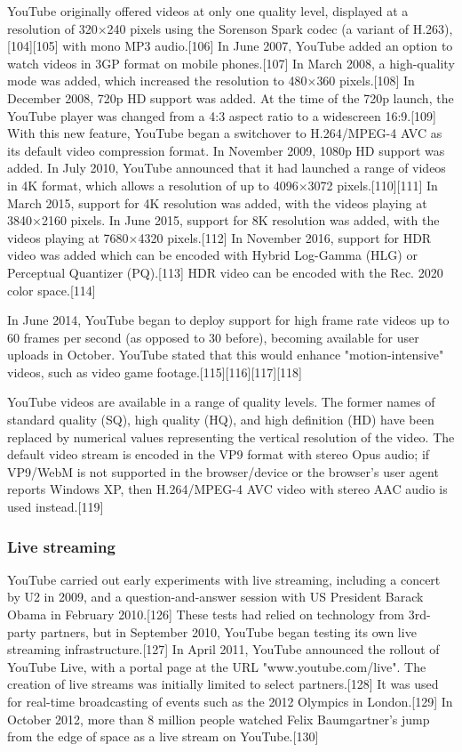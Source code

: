 \documentclass[12pt]{article}
\begin{document}
YouTube originally offered videos at only one quality level, displayed at a resolution of 320$\times$240 pixels using the Sorenson Spark codec (a variant of H.263),[104][105] with mono MP3 audio.[106] In June 2007, YouTube added an option to watch videos in 3GP format on mobile phones.[107] In March 2008, a high-quality mode was added, which increased the resolution to 480$\times$360 pixels.[108] In December 2008, 720p HD support was added. At the time of the 720p launch, the YouTube player was changed from a 4:3 aspect ratio to a widescreen 16:9.[109] With this new feature, YouTube began a switchover to H.264/MPEG-4 AVC as its default video compression format. In November 2009, 1080p HD support was added. In July 2010, YouTube announced that it had launched a range of videos in 4K format, which allows a resolution of up to 4096$\times$3072 pixels.[110][111] In March 2015, support for 4K resolution was added, with the videos playing at 3840$\times$2160 pixels. In June 2015, support for 8K resolution was added, with the videos playing at 7680$\times$4320 pixels.[112] In November 2016, support for HDR video was added which can be encoded with Hybrid Log-Gamma (HLG) or Perceptual Quantizer (PQ).[113] HDR video can be encoded with the Rec. 2020 color space.[114]

In June 2014, YouTube began to deploy support for high frame rate videos up to 60 frames per second (as opposed to 30 before), becoming available for user uploads in October. YouTube stated that this would enhance "motion-intensive" videos, such as video game footage.[115][116][117][118]

YouTube videos are available in a range of quality levels. The former names of standard quality (SQ), high quality (HQ), and high definition (HD) have been replaced by numerical values representing the vertical resolution of the video. The default video stream is encoded in the VP9 format with stereo Opus audio; if VP9/WebM is not supported in the browser/device or the browser's user agent reports Windows XP, then H.264/MPEG-4 AVC video with stereo AAC audio is used instead.[119] 



\subsubsection{Live streaming}


YouTube carried out early experiments with live streaming, including a concert by U2 in 2009, and a question-and-answer session with US President Barack Obama in February 2010.[126] These tests had relied on technology from 3rd-party partners, but in September 2010, YouTube began testing its own live streaming infrastructure.[127] In April 2011, YouTube announced the rollout of YouTube Live, with a portal page at the URL "www.youtube.com/live". The creation of live streams was initially limited to select partners.[128] It was used for real-time broadcasting of events such as the 2012 Olympics in London.[129] In October 2012, more than 8 million people watched Felix Baumgartner's jump from the edge of space as a live stream on YouTube.[130]
\end{document}
